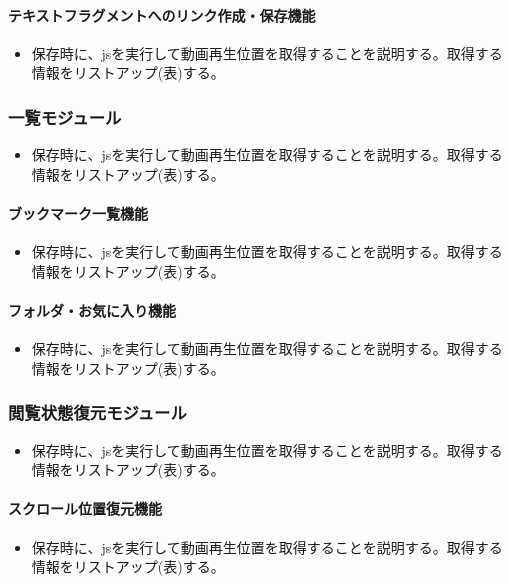 \paragraph{テキストフラグメントへのリンク作成・保存機能}
\begin{itemize}
  \item 保存時に、jsを実行して動画再生位置を取得することを説明する。取得する情報をリストアップ(表)する。
\end{itemize}

\subsubsection{一覧モジュール}
\begin{itemize}
  \item 保存時に、jsを実行して動画再生位置を取得することを説明する。取得する情報をリストアップ(表)する。
\end{itemize}

\paragraph{ブックマーク一覧機能}
\begin{itemize}
  \item 保存時に、jsを実行して動画再生位置を取得することを説明する。取得する情報をリストアップ(表)する。
\end{itemize}

\paragraph{フォルダ・お気に入り機能}
\begin{itemize}
  \item 保存時に、jsを実行して動画再生位置を取得することを説明する。取得する情報をリストアップ(表)する。
\end{itemize}

\subsubsection{閲覧状態復元モジュール}
\begin{itemize}
  \item 保存時に、jsを実行して動画再生位置を取得することを説明する。取得する情報をリストアップ(表)する。
\end{itemize}

\paragraph{スクロール位置復元機能}
\begin{itemize}
  \item 保存時に、jsを実行して動画再生位置を取得することを説明する。取得する情報をリストアップ(表)する。
\end{itemize}

